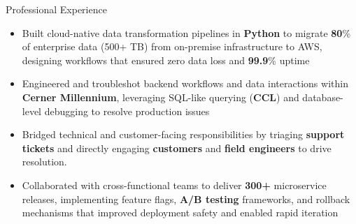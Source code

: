 \documentclass{resume}
\begin{document}
\begin{experienceSection}{Professional Experience}
    \experienceItem[
        company={Cerner Healthcare (Oracle Cerner)},
        location={Bangalore, KA},
        position={Software Engineer (Systems)},
        duration={May 2021 - Jul 2023}
    ]
    \begin{itemize}
        \itemsep -6pt {}
        \item Built cloud-native data transformation pipelines in \textbf{Python} to migrate \textbf{80}\% of enterprise data (500+ TB) from on-premise infrastructure to AWS, designing workflows that ensured zero data loss and \textbf{99.9}\% uptime
        \item Engineered and troubleshot backend workflows and data interactions within \textbf{Cerner Millennium}, leveraging SQL-like querying (\textbf{CCL}) and database-level debugging to resolve production issues
        \item Bridged technical and customer-facing responsibilities by triaging \textbf{support tickets} and directly engaging \textbf{customers} and \textbf{field engineers} to drive resolution.
        \item Collaborated with cross-functional teams to deliver \textbf{300+} microservice releases, implementing feature flags, \textbf{A/B testing} frameworks, and rollback mechanisms that improved deployment safety and enabled rapid iteration
    \end{itemize}

\end{experienceSection}
\end{document}
